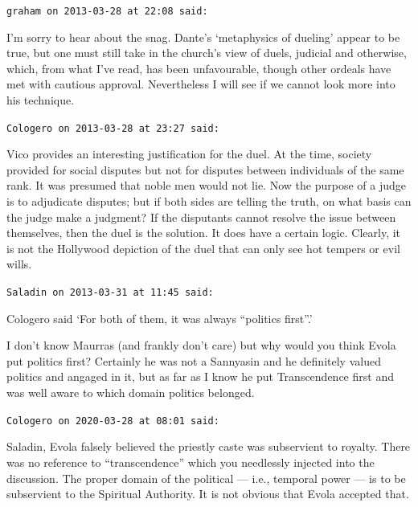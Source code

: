 \begin{footnotesize}
\begin{sffamily}
\texttt{graham on 2013-03-28 at 22:08 said:}

I'm sorry to hear about the snag. Dante's `metaphysics of dueling' appear to be true, but one must still take in the church's view of duels, judicial and otherwise, which, from what I've read, has been unfavourable, though other ordeals have met with cautious approval. Nevertheless I will see if we cannot look more into his technique.

\hfill

\texttt{Cologero on 2013-03-28 at 23:27 said:}

Vico provides an interesting justification for the duel. At the time, society provided for social disputes but not for disputes between individuals of the same rank. It was presumed that noble men would not lie. Now the purpose of a judge is to adjudicate disputes; but if both sides are telling the truth, on what basis can the judge make a judgment? If the disputants cannot resolve the issue between themselves, then the duel is the solution. It does have a certain logic. Clearly, it is not the Hollywood depiction of the duel that can only see hot tempers or evil wills.

\hfill

\texttt{Saladin on 2013-03-31 at 11:45 said:}

Cologero said `For both of them, it was always ``politics first''.'

I don't know Maurras (and frankly don't care) but why would you think Evola put politics first? Certainly he was not a Sannyasin and he definitely valued politics and angaged in it, but as far as I know he put Transcendence first and was well aware to which domain politics belonged.

\hfill

\texttt{Cologero on 2020-03-28 at 08:01 said:}

Saladin, Evola falsely believed the priestly caste was subservient to royalty. There was no reference to ``transcendence'' which you needlessly injected into the discussion. The proper domain of the political --- i.e., temporal power --- is to be subservient to the Spiritual Authority. It is not obvious that Evola accepted that.

\end{sffamily}
\end{footnotesize}

